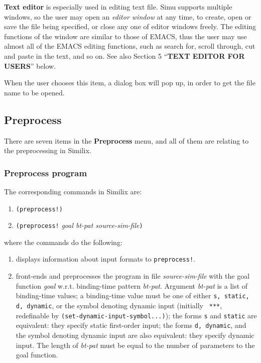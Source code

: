\begin{sloppypar}
{\bf Text editor} is especially used in editing text file.  Simu
supports multiple windows, so the user may open an {\it editor window}
at any time, to create, open or save the file being specified, or
close any one of editor windows freely. The editing functions of the
window are similar to those of EMACS, thus the user may use almost all
of the EMACS editing functions, such as search for, scroll through,
cut and paste in the text, and so on. See also Section 5 ``{\bf TEXT
EDITOR FOR USERS}'' below.

   When the user chooses this item, a dialog box will pop up, in order
to get the file name to be opened.



\subsection{Preprocess}


There are seven items in the {\bf Preprocess} menu, and all of them
are relating to the preprocessing in Similix.


\subsubsection{Preprocess program}


The corresponding commands in Similix are:

\begin{enumerate}
\item {\tt (preprocess!)}
\item {\tt (preprocess!} {\it goal bt-pat source-sim-file}{\tt )}
\end{enumerate}

\noindent where the commands do the following:

\begin{enumerate}
\item displays information about input formats to {\tt preprocess!}.

\item front-ends and preprocesses the program in file {\it source-sim-file}
   with the goal function {\it goal} w.r.t. binding-time pattern {\it
   bt-pat}.  Argument {\it bt-pat} is a list of binding-time values; a
   binding-time value must be one of either {\tt s, static, d,
   dynamic}, or the symbol denoting dynamic input (initially {\tt
   ***}, redefinable by {\tt (set-dynamic-input-symbol...)}); the
   forms {\tt s} and {\tt static} are equivalent: they specify static
   first-order input; the forms {\tt d, dynamic}, and the symbol
   denoting dynamic input are also equivalent: they specify dynamic
   input. The length of {\it bt-pat} must be equal to the number of
   parameters to the goal function.


\end{enumerate}
\end{sloppypar}
